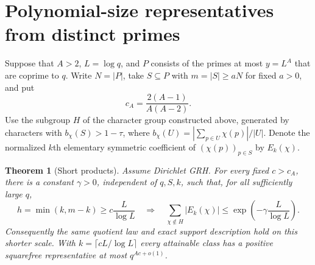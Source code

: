 \documentclass[11pt]{article}
\newtheorem{theorem}{Theorem}[section]
\begin{document}
\section{Polynomial-size representatives from distinct primes}
\label{sec:acceleration}

Suppose that $A>2$, $L=\log q$, and $P$ consists of the primes at most
$y=L^A$ that are coprime to $q$. Write $N=|P|$, take $S\subseteq P$
with $m=|S|\ge aN$ for fixed $a>0$, and put
\[
 c_A=\frac{2(A-1)}{A(A-2)}.
\]
Use the subgroup $H$ of the character group constructed above, generated
by characters with $b_\chi(S)>1-\tau$, where
$b_\chi(U)=|\sum_{p\in U}\chi(p)|/|U|$. Denote the normalized $k$th
elementary symmetric coefficient of $(\chi(p))_{p\in S}$ by $E_k(\chi)$.

\begin{theorem}[Short products]
\label{thm:short-products}
Assume Dirichlet GRH. For every fixed $c>c_A$, there is a constant
$\gamma>0$, independent of $q,S,k$, such that, for all sufficiently large $q$,
\[
 h=\min(k,m-k)\ge c\frac{L}{\log L}
 \quad\Longrightarrow\quad
 \sum_{\chi\notin H}|E_k(\chi)|\le
 \exp\!\left(-\gamma\frac{L}{\log L}\right).
\]
Consequently the same quotient law and exact support description hold
on this shorter scale. With $k=\lceil cL/\log L\rceil$ every attainable
class has a positive squarefree representative at most $q^{Ac+o(1)}$.
\end{theorem}
\end{document}
